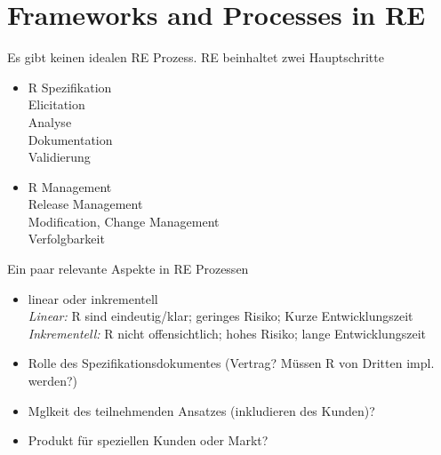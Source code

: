 \section{Frameworks and Processes in RE}
Es gibt keinen idealen RE Prozess. RE beinhaltet zwei Hauptschritte
\begin{itemize}
	\item R Spezifikation\\
	Elicitation\\
	Analyse\\
	Dokumentation\\
	Validierung
	
	\item R Management\\
	Release Management\\
	Modification, Change Management\\
	Verfolgbarkeit
\end{itemize}

Ein paar relevante Aspekte in RE Prozessen
\begin{itemize}
	\item linear oder inkrementell\\
	\textit{Linear:} R sind eindeutig/klar; geringes Risiko; Kurze Entwicklungszeit\\
	\textit{Inkrementell:} R nicht offensichtlich; hohes Risiko; lange Entwicklungszeit
	\item Rolle des Spezifikationsdokumentes (Vertrag? Müssen R von Dritten impl. werden?)
	\item Mglkeit des teilnehmenden Ansatzes (inkludieren des Kunden)?
	\item Produkt für speziellen Kunden oder Markt?
\end{itemize}

